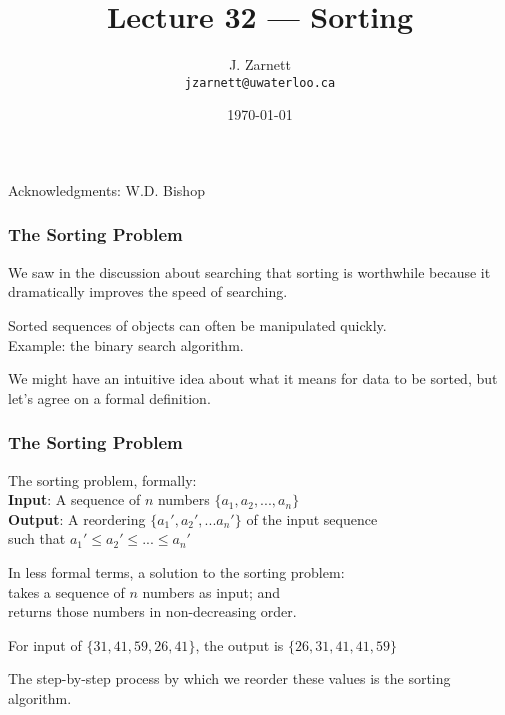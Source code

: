 

\title{Lecture 32 --- Sorting }

\author{J. Zarnett\\
\texttt{jzarnett@uwaterloo.ca}}
\date{\today}



\begin{frame}
  \titlepage
  
  \begin{center}
  \small{Acknowledgments: W.D. Bishop}
  \end{center}
\end{frame}

\begin{frame}
\frametitle{The Sorting Problem}
We saw in the discussion about searching that sorting is worthwhile because it dramatically improves the speed of searching.

Sorted sequences of objects can often be manipulated quickly.\\
\quad Example: the binary search algorithm.

We might have an intuitive idea about what it means for data to be sorted, but let's agree on a formal definition.

\end{frame}

\begin{frame}
\frametitle{The Sorting Problem}

The sorting problem, formally:\\
\quad \textbf{Input}: A sequence of $n$ numbers $\{a_{1}, a_{2}, ...,  a_{n}\}$\\
\quad \textbf{Output}: A reordering $\{a_{1}', a_{2}', ... a_{n}'\}$ of the input sequence \\
\quad \quad \quad such that $a_{1}' \leq a_{2}' \leq ... \leq a_{n}'$

In less formal terms, a solution to the sorting problem:\\
\quad takes a sequence of $n$ numbers as input; and \\
\quad returns those numbers in non-decreasing order.

For input of $\{31, 41, 59, 26, 41\}$, the output is $\{26, 31, 41, 41, 59 \}$

The step-by-step process by which we reorder these values is the \alert{sorting algorithm}.



\end{frame}

